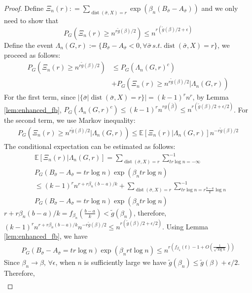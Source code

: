 \documentclass[entropy,article,submit,moreauthors,pdftex]{Definitions/mdpi}
\newcommand{\1}{\mathbbm{1}}
\DeclareMathOperator{\Dist}{dist}
\begin{document}
\begin{proof}
Define $\Xi_n(r): = \sum_{\Dist(\bar{\sigma}, X)=r}\exp(\beta_n(B_{\bar{\sigma}}-A_{\bar{\sigma}}))$ and we only need to show that
\begin{equation}
P_{G}(\Xi_n(r) \geq n^{r \tilde{g}(\beta) /2}) \leq  n^{r (\tilde{g}(\beta) /2 + \epsilon)}
\end{equation}
Define the event $\Lambda_n(G,r):=\{B_{\bar{\sigma}} -A_{\bar{\sigma}} < 0, \forall \bar{\sigma}\, s.t. \Dist(\bar{\sigma}, X)=r\}$,
we proceed as follows:
\begin{align*}
P_{G}(\Xi_n(r) \geq n^{r \tilde{g}(\beta) /2}) &\leq
P_G(\Lambda_n(G,r)^c) \\
&+ P_G(\Xi_n(r) \geq n^{r \tilde{g}(\beta) /2} |\Lambda_n(G,r) )
\end{align*}
For the first term, since $|\{ \bar{\sigma} | \Dist(\bar{\sigma}, X) = r \}|=(k-1)^r n^r$,
by Lemma \ref{lem:enhanced_fb},
$P_G(\Lambda_n(G,r)^c) \leq (k-1)^r n^{rg(\bar{\beta})} \leq n^{r (\tilde{g}(\beta) /2 + \epsilon/2)}$.
For the second term, we use Markov inequality:
\begin{align*}
P_G(\Xi_n(r) \geq n^{r \tilde{g}(\beta) /2} |\Lambda_n(G,r) )
\leq \mathbb{E}[\Xi_n(r)|\Lambda_n(G,r)]n^{-r \tilde{g}(\beta) /2} 
\end{align*}
The conditional expectation can be estimated as follows:
\begin{align*}
&\mathbb{E}[\Xi_n(r)|\Lambda_n(G,r)]=
\sum_{\Dist(\bar{\sigma}, X) = r}\sum_{tr\log n = -\infty }^{-1} \\
& P_G(B_{\bar{\sigma}} -A_{\bar{\sigma}}=tr\log n)\exp(\beta_n tr \log n) \\
& \leq (k-1)^r n^{r+r\beta_n(b-a)/k} +
\sum_{\Dist(\bar{\sigma}, X) = r}\sum_{tr\log n = r\frac{b-a}{k}\log n }^{-1} \\
& P_G(B_{\bar{\sigma}} -A_{\bar{\sigma}}=tr\log n)\exp(\beta_n tr \log n)
\end{align*}
$r+r\beta_n(b-a)/k = f_{\beta_n}(\frac{b-a}{k}) < \tilde{g}(\beta_n)$, therefore,
$(k-1)^r n^{r+r\beta_n (b-a)/k}n^{-r \tilde{g}(\beta) /2} \leq n^{r (\tilde{g}(\beta) /2 + \epsilon/2)} $.
Using Lemma \ref{lem:enhanced_fb}, we have
\begin{align*}
P_G(B_{\bar{\sigma}} -A_{\bar{\sigma}}=tr\log n)\exp(\beta_n rt \log n) \leq 
n^{r(f_{\beta_n}(t)-1 + O(\frac{1}{\sqrt{\log n}}))}
\end{align*}
Since $\beta_n \to \beta$, $\forall \epsilon$, when $n$ is sufficiently large
we have $\tilde{g}(\beta_n) \leq \tilde{g}(\beta) + \epsilon /2$.
Therefore,
\begin{align*}

\end{align*}
\end{proof}
\end{document}
